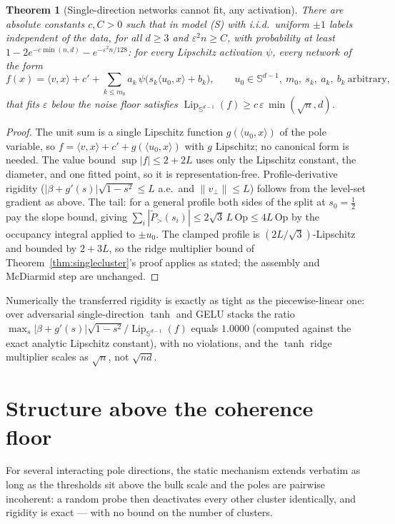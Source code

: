 \documentclass[11pt,reqno]{amsart}
\theoremstyle{plain}
\newtheorem{theorem}{Theorem}[section]
\theoremstyle{definition}
\theoremstyle{remark}
\newcommand{\Sd}{\mathbb{S}^{d-1}}
\newcommand{\eps}{\varepsilon}
\newcommand{\Lip}{\operatorname{Lip}}
\newcommand{\inn}[2]{\langle #1,#2\rangle}
\begin{document}
\begin{theorem}[Single-direction networks cannot fit, any activation]\label{thm:singleclusterpsi}
There are absolute constants $c,C>0$ such that in model (S) with i.i.d.\ uniform $\pm1$ labels independent of the data, for all $d\ge3$ and $\eps^2n\ge C$, with probability at least $1-2e^{-c\min(n,d)}-e^{-\eps^2n/128}$: for \emph{every} Lipschitz activation $\psi$, every network of the form
\[
f(x)=\inn vx+c'+\sum_{k\le m_0}a_k\,\psi\bigl(s_k\inn{u_0}x+b_k\bigr),\qquad u_0\in\Sd,\ m_0,\ s_k,\ a_k,\ b_k\ \text{arbitrary},
\]
that fits $\eps$ below the noise floor satisfies $\Lip_{\Sd}(f)\ge c\,\eps\,\min(\sqrt n,d)$.
\end{theorem}
\begin{proof}[Proof]
The unit sum is a single Lipschitz function $g(\inn{u_0}x)$ of the pole variable, so $f=\inn vx+c'+g(\inn{u_0}x)$ with $g$ Lipschitz; no canonical form is needed. The value bound $\sup|f|\le2+2L$ uses only the Lipschitz constant, the diameter, and one fitted point, so it is representation-free. Profile-derivative rigidity ($|\beta+g'(s)|\sqrt{1-s^2}\le L$ a.e.\ and $\|v_\perp\|\le L$) follows from the level-set gradient as above. The tail: for a general profile both sides of the split at $s_0=\tfrac12$ pay the slope bound, giving $\sum_i|\tilde P_>(s_i)|\le2\sqrt3\,L\,\mathrm{Op}\le4L\,\mathrm{Op}$ by the occupancy integral applied to $\pm u_0$. The clamped profile is $(2L/\sqrt3)$-Lipschitz and bounded by $2+3L$, so the ridge multiplier bound of Theorem~\ref{thm:singlecluster}'s proof applies as stated; the assembly and McDiarmid step are unchanged.
\end{proof}

Numerically the transferred rigidity is exactly as tight as the piecewise-linear one: over adversarial single-direction $\tanh$ and GELU stacks the ratio $\max_s|\beta+g'(s)|\sqrt{1-s^2}/\Lip_{\Sd}(f)$ equals $1.0000$ (computed against the exact analytic Lipschitz constant), with no violations, and the $\tanh$ ridge multiplier scales as $\sqrt n$, not $\sqrt{nd}$.

\section{Structure above the coherence floor}

For several interacting pole directions, the static mechanism extends verbatim as long as the thresholds sit above the bulk scale and the poles are pairwise incoherent: a random probe then deactivates every other cluster identically, and rigidity is exact --- with no bound on the number of clusters.
\end{document}
